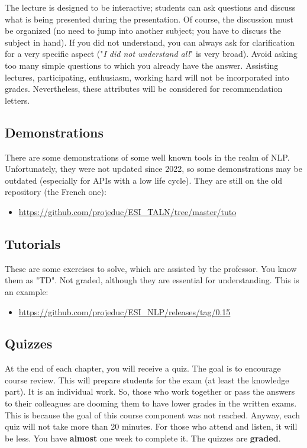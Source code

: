 \documentclass[11pt, a4paper]{article}
\begin{document}
The lecture is designed to be interactive; students can ask questions and discuss what is being presented during the presentation. 
Of course, the discussion must be organized (no need to jump into another subject; you have to discuss the subject in hand).
If you did not understand, you can always ask for clarification for a very specific aspect ("\textit{I did not understand all}" is very broad). 
Avoid asking too many simple questions to which you already have the answer.
Assisting lectures, participating, enthusiasm, working hard will not be incorporated into grades.
Nevertheless, these attributes will be considered for recommendation letters.

\subsection{Demonstrations}

There are some demonstrations of some well known tools in the realm of NLP. 
Unfortunately, they were not updated since 2022, so some demonstrations may be outdated (especially for APIs with a low life cycle).
They are still on the old repository (the French one):
\begin{itemize}
	\item \url{https://github.com/projeduc/ESI_TALN/tree/master/tuto}
\end{itemize}

\subsection{Tutorials}

These are some exercises to solve, which are assisted by the professor.
You know them as "TD". 
Not graded, although they are essential for understanding.
This is an example:
\begin{itemize}
	\item \url{https://github.com/projeduc/ESI_NLP/releases/tag/0.15}
\end{itemize}

\subsection{Quizzes}

At the end of each chapter, you will receive a quiz.
The goal is to encourage course review. 
This will prepare students for the exam (at least the knowledge part).
It is an individual work.
So, those who work together or pass the answers to their colleagues are dooming them to have lower grades in the written exams.
This is because the goal of this course component was not reached.
%
Anyway, each quiz will not take more than 20 minutes.
For those who attend and listen, it will be less.
You have \textbf{almost} one week to complete it. 
The quizzes are \textbf{graded}.
\end{document}
